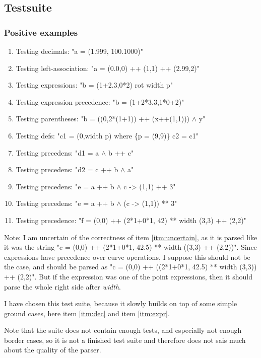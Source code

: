 \documentclass[a4paper, 10pt]{article}
\begin{document}
\subsection*{Testsuite}
\subsubsection*{Positive examples}
\begin{enumerate}
    \item\label{itm:dec} Testing decimals: "a = (1.999, 100.1000)"
    \item\label{itm:lassoc} Testing left-association: "a = (0.0,0) ++ (1,1) ++ (2.99,2)"
    \item\label{itm:expr} Testing expressions: "b = (1+2.3,0*2) rot width p"
    \item\label{itm:exprprec} Testing expression precedence: "b = (1+2*3.3,1*0+2)"
    \item\label{itm:parens} Testing parentheses: "b = ((0,2*(1+1)) ++ (x++(1,1))) $\wedge$ y"
    \item\label{itm:defs} Testing defs: "c1 = (0,width p) where \{p = (9,9)\} c2 = c1"
    \item\label{itm:prec1} Testing precedens: "d1 = a $\wedge$ b ++ c"
    \item\label{itm:prec2} Testing precedens: "d2 = c ++ b $\wedge$ a"
    \item\label{itm:prec3} Testing precedens: "e = a ++ b $\wedge$ c -> (1,1) ++ 3"
    \item\label{itm:prec3} Testing precedens: "e = a ++ b $\wedge$ (c -> (1,1)) ** 3"
    \item\label{itm:uncertain} Testing precedence: "f = (0,0) ++ (2*1+0*1, 42) ** width (3,3) ++ (2,2)"
\end{enumerate}
Note: I am uncertain of the correctness of item \ref{itm:uncertain}, as it is parsed like it was the string "c = (0,0) ++ (2*1+0*1, 42.5) ** width ((3,3) ++ (2,2))". Since expressions have precedence over curve operations, I suppose this should not be the case, and should be parsed as "c = (0,0) ++ ((2*1+0*1, 42.5) ** width (3,3)) ++ (2,2)". But if the expression was one of the point expressions, then it should parse the whole right side after \textit{width}.

I have chosen this test suite, because it slowly builds on top of some simple ground cases, here item \ref{itm:dec} and item \ref{itm:expr}.

Note that the suite does not contain enough tests, and especially not enough border cases, so it is not a finished test suite and therefore does not sais much about the quality of the parser. 
\end{document}
